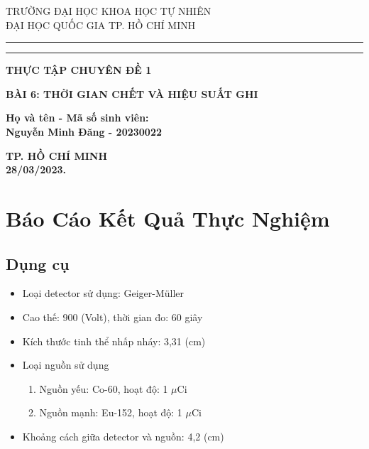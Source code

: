 \documentclass{article}
\begin{document}
\date{\today}

\textwidth=450pt\oddsidemargin=0pt
\begin{titlepage}
\begin{center}
{{\large{\textsc{TRƯỜNG ĐẠI HỌC KHOA HỌC TỰ NHIÊN \\ ĐẠI HỌC QUỐC GIA TP. HỒ CHÍ MINH}}}} \rule[0.1cm]{15.8cm}{0.1mm}
\rule[0.5cm]{15.8cm}{0.6mm}

\vspace{2cm}

{\Large{\bf THỰC TẬP CHUYÊN ĐỀ 1 }}
\end{center}
\vspace{15mm}
\begin{center}
{\LARGE{\bf BÀI 6: THỜI GIAN CHẾT VÀ HIỆU SUẤT GHI}}
\end{center}
\vspace{4cm}
\par
\noindent
\begin{minipage}[h]{\linewidth}
{\large{\bf Họ và tên - Mã số sinh viên:\\
Nguyễn Minh Đăng - 20230022\\}}
\end{minipage}

\vspace{8cm}

\begin{center}
{\large{\bf TP. HỒ CHÍ MINH \\
28/03/2023.}}
\end{center}
\end{titlepage}

\newpage
\clearpage\thispagestyle{empty}\addtocounter{page}{-1} 
\clearpage
\mbox{}
\newpage

\section*{\centering Báo Cáo Kết Quả Thực Nghiệm}
\vspace{1cm}

\setcounter{section}{1}
\subsection{Dụng cụ}
\begin{itemize}
	\item Loại detector sử dụng: Geiger-Müller
	\item Cao thế: 900 (Volt), thời gian đo: 60 giây
	\item Kích thước tinh thể nhấp nháy: 3,31 (cm)
	\item Loại nguồn sử dụng
		\begin{enumerate}
			\item Nguồn yếu: Co-60, hoạt độ: 1 $\mu$Ci
			\item Nguồn mạnh: Eu-152, hoạt độ: 1 $\mu$Ci
		\end{enumerate}
	\item Khoảng cách giữa detector và nguồn: 4,2 (cm)
\end{itemize}
\end{document}
